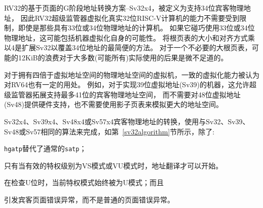 \begin{commentary}
  RV32的基于页面的G阶段地址转换方案--Sv32x4，被定义为支持34位宾客物理地址，
  因此RV32超级监管器虚拟化真实32位RISC-V计算机的能力不需要受到限制，即使是那些具有33位或34位物理地址的计算机。
  如果它碰巧使用33位或34位物理地址，这可能包括机器虚拟化自身的可能性。
  将根页表的大小和对齐方式乘以4是扩展Sv32以覆盖34位地址的最简便的方法。
  对于一个不必要的大根页表，可能的12KiB的浪费对于大多数(可能所有)实际使用的后果是微不足道的。

对于拥有四倍于虚拟地址空间的物理地址空间的虚拟机，一致的虚拟化能力被认为对RV64也有一定的用处。
例如，对于实现39位虚拟地址(Sv39)的机器，这允许超级监管器拓展支持最多41位的宾客物理地址空间，
而不需要对48位虚拟地址(Sv48)提供硬件支持，也不需要使用影子页表来模拟更大的地址空间。
\end{commentary}

Sv32x4、Sv39x4、Sv48x4或Sv57x4宾客物理地址的转换，使用与Sv32、Sv39、Sv48或Sv57相同的算法来完成，如第~\ref{sv32algorithm}节所示，除了:
\begin{compactitem}
\item
{\tt hgatp}替代了通常的{\tt satp}；
\item
只有当有效的特权级别为VS模式或VU模式时，地址翻译才可以开始。
\item
在检查U位时，当前特权模式始终被为U模式；而且
\item
引发宾客页面错误异常，而不是普通的页面错误异常。
\end{compactitem}


